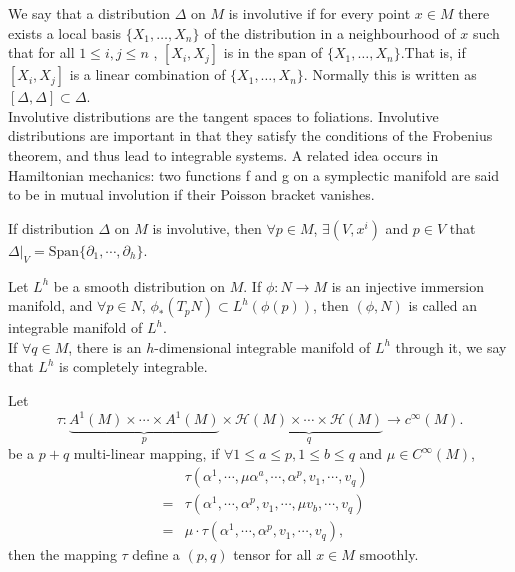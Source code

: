 \begin{newdef}
We say that a distribution $\Delta$ on $M$ is involutive if for every point $x \in M$ there exists a local basis $\{X_{1},\ldots ,X_{n}\}$ of the distribution in a neighbourhood of $x$ such that for all $1\leq i,j\leq n$ , $[X_{i},X_{j}]$  is in the span of $\{X_{1},\ldots ,X_{n}\}$.That is, if $[X_{i},X_{j}]$ is a linear combination of $\{X_{1},\ldots ,X_{n}\}$. Normally this is written as $ [\Delta ,\Delta ]\subset \Delta $.\\
Involutive distributions are the tangent spaces to foliations. Involutive distributions are important in that they satisfy the conditions of the Frobenius theorem, and thus lead to integrable systems.
A related idea occurs in Hamiltonian mechanics: two functions f and g on a symplectic manifold are said to be in mutual involution if their Poisson bracket vanishes.
\end{newdef}

\begin{newthem}
 If distribution $\Delta$ on $M$ is involutive, then $\forall p \in M$, $\exists (V,x^i)$ and $p \in V$ that $\Delta|_{V} = \mathrm{Span} \{ \partial_{1} , \cdots, \partial_{h}\}$.
\end{newthem}

\begin{newdef}
Let $L^{h}$ be a smooth distribution on $M$. If $\phi:N \to M$ is an injective immersion manifold, and $\forall p \in N$, $\phi_{*}(T_pN) \subset L^h(\phi(p))$, then $(\phi,N)$ is called an integrable manifold of $L^h$.\\
If $\forall q \in M$, there is an $h$-dimensional integrable manifold of $L^h$ through it, we say that $L^h$ is completely integrable.
\end{newdef}
\begin{newthem}
Let
\[\tau: \underbrace{A^1(M) \times \cdots \times A^1(M)}_p \times \underbrace{\mathcal{H}(M) \times \cdots \times \mathcal{H}(M)}_q \to c^{\infty}(M).\] 
be a $p+q$ multi-linear mapping, if $\forall 1 \leq a \leq p,1 \leq b \leq q$ and $\mu \in C^{\infty}(M)$,
\begin{eqnarray}
&&\tau(\alpha^1,\cdots,\mu \alpha^{a},\cdots,\alpha^p,v_1,\cdots,v_q)\nonumber \\
&=&\tau(\alpha^1,\cdots,\alpha^p,v_1,\cdots,\mu v_{b},\cdots,v_q)\nonumber \\
&=&\mu \cdot \tau(\alpha^1,\cdots,\alpha^p,v_1,\cdots,v_q), \nonumber
\end{eqnarray}
then the mapping $\tau$ define a $(p,q)$ tensor for all $x \in M$ smoothly.
\end{newthem}

